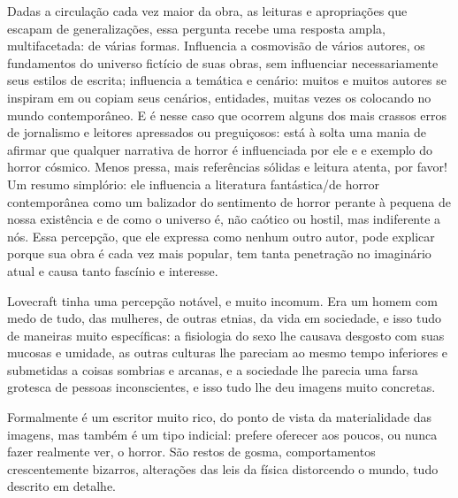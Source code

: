 \begin{changemargin}
\bigskip


Dadas a circulação cada vez maior da obra, as leituras e apropriações que escapam de generalizações, essa pergunta recebe uma resposta ampla, multifacetada: de várias formas. Influencia a cosmovisão de vários autores, os fundamentos do universo fictício de suas obras, sem influenciar necessariamente seus estilos de escrita; influencia a temática e cenário: muitos e muitos autores se inspiram em ou copiam seus cenários, entidades, muitas vezes os colocando no mundo contemporâneo. E é nesse caso que ocorrem alguns dos mais crassos erros de jornalismo e leitores apressados ou preguiçosos: está à solta uma mania de afirmar que qualquer narrativa de horror é influenciada por ele e e exemplo do horror cósmico. Menos pressa, mais referências sólidas e leitura atenta, por favor! Um resumo simplório: ele influencia a literatura fantástica/de horror contemporânea como um balizador do sentimento de horror perante à pequena de nossa existência e de como o universo é, não caótico ou hostil, mas indiferente a nós. Essa percepção, que ele expressa como nenhum outro autor, pode explicar porque sua obra é cada vez mais popular, tem tanta penetração no imaginário atual e causa tanto fascínio e interesse.

\bigskip
\bigskip
\pagebreak


\bigskip


Lovecraft tinha uma percepção notável, e muito incomum. Era um homem com medo de tudo, das mulheres, de outras etnias, da vida em sociedade, e isso tudo de maneiras muito específicas: a fisiologia do sexo lhe causava desgosto com suas mucosas e umidade, as outras culturas lhe pareciam ao mesmo tempo inferiores e submetidas a coisas sombrias e arcanas, e a sociedade lhe parecia uma farsa grotesca de pessoas inconscientes, e isso tudo lhe deu imagens muito concretas.

Formalmente é um escritor muito rico, do ponto de vista da materialidade das imagens, mas também é um tipo indicial: prefere oferecer aos poucos, ou nunca fazer realmente ver, o horror. São restos de gosma, comportamentos crescentemente bizarros, alterações das leis da física distorcendo o mundo, tudo descrito em detalhe.


\end{changemargin}
